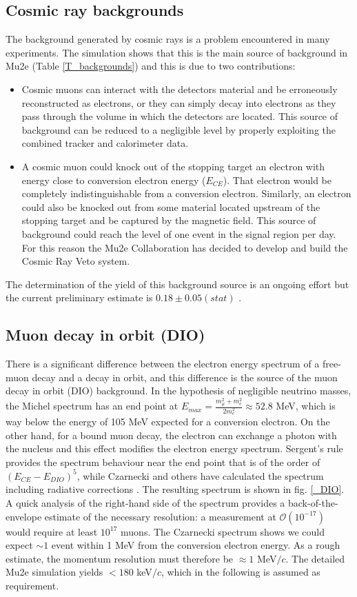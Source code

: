 \documentclass[12pt,a4paper,openright, oneside, titlepage]{book} %
\begin{document}
\subsection{Cosmic ray backgrounds}
The background generated by cosmic rays is a problem encountered in many experiments.
The simulation shows that this is the main source of background in Mu2e (Table \ref{T_backgrounds})
and this is due to two contributions:

\begin{itemize}
\item Cosmic muons can interact with the detectors material and be erroneously reconstructed as electrons, or they can simply decay into electrons as they pass through the volume in which the detectors are located. 
This source of background can be reduced to a negligible level by properly exploiting the combined tracker and calorimeter data.
\item A cosmic muon could knock out of the stopping target an electron with energy close to conversion electron energy ($E_{CE}$). 
That electron would be completely indistinguishable from a conversion electron. 
Similarly, an electron could also be knocked out from some material located upstream of the stopping target and be captured by the magnetic field. 
This source of background could reach the level of one event in the signal region per day.
For this reason the Mu2e Collaboration has decided to develop and build the Cosmic Ray Veto system.
\end{itemize}
The determination of the yield of this background source is an ongoing effort but the current preliminary estimate is $0.18\pm0.05(stat)$ \cite{CRV_now}.

\subsection{Muon decay in orbit (DIO)}
There is a significant difference between the electron energy spectrum of a free-muon decay and a decay in orbit, and this difference is the source of the muon decay in orbit (DIO) background.
In the hypothesis of negligible neutrino masses, the Michel spectrum has an end point at $E_{max}=\frac{m_\mu^2+m_e^2}{2m_e^2}\approx52.8$ MeV, which is way below the energy of 105 MeV expected for a conversion electron.
On the other hand, for a bound muon decay, the electron can exchange a photon with the nucleus and this effect modifies the electron energy spectrum. 
Sergent's rule provides the spectrum behaviour near the end point that is of the order of $(E_{CE}-E_{DIO})^5$, while Czarnecki and others have calculated the spectrum including radiative corrections \cite{Czarnecki} \cite{Czarnecki2015}.
The resulting spectrum is shown in fig. \ref{_DIO}.
A quick analysis of the right-hand side of the spectrum provides a back-of-the-envelope estimate of the necessary resolution: a measurement at $\mathcal{O}(10^{-17})$ would require at least $10^{17}$ muons. 
The Czarnecki spectrum shows we could expect $\sim1$ event within 1 MeV from the conversion electron energy. 
As a rough estimate, the momentum resolution must therefore be $\approx1$ MeV$/c$. 
The detailed Mu2e simulation yields $<180$ keV$/c$, which in the following is assumed as requirement.\\
\end{document}
